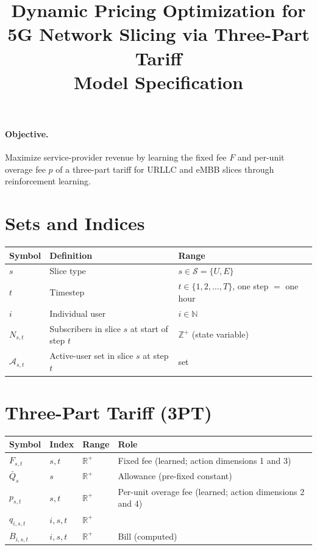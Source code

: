 \documentclass[11pt]{article}
\title{Dynamic Pricing Optimization for 5G Network Slicing via Three-Part Tariff\\\large Model Specification}
\author{}
\date{}
\begin{document}
\maketitle

\paragraph{Objective.}
Maximize service-provider revenue by learning the fixed fee $F$ and per-unit overage fee $p$ of a three-part tariff for URLLC and eMBB slices through reinforcement learning.

\section{Sets and Indices}

\begin{longtable}{@{}llll@{}}
\toprule
Symbol & Definition & Range \\
\midrule
\endhead
$s$ & Slice type & $s \in \mathcal{S} = \{U, E\}$ \\
$t$ & Timestep & $t \in \{1, 2, \ldots, T\}$, one step $=$ one hour \\
$i$ & Individual user & $i \in \mathbb{N}$ \\
$N_{s,t}$ & Subscribers in slice $s$ at start of step $t$ & $\mathbb{Z}^{+}$ (state variable) \\
$\mathcal{A}_{s,t}$ & Active-user set in slice $s$ at step $t$ & set \\
\bottomrule
\end{longtable}

\section{Three-Part Tariff (3PT)}

\begin{longtable}{@{}llll@{}}
\toprule
Symbol & Index & Range & Role \\
\midrule
\endhead
$F_{s,t}$ & $s,t$ & $\mathbb{R}^{+}$ & Fixed fee (learned; action dimensions 1 and 3) \\
$\bar{Q}_{s}$ & $s$ & $\mathbb{R}^{+}$ & Allowance (pre-fixed constant) \\
$p_{s,t}$ & $s,t$ & $\mathbb{R}^{+}$ & Per-unit overage fee (learned; action dimensions 2 and 4) \\
$q_{i,s,t}$ & $i,s,t$ & $\mathbb{R}^{+}$ & {\color{blue}{Data usage (random variable)}} \\
$B_{i,s,t}$ & $i,s,t$ & $\mathbb{R}^{+}$ & Bill (computed) \\
\bottomrule
\end{longtable}
\end{document}
